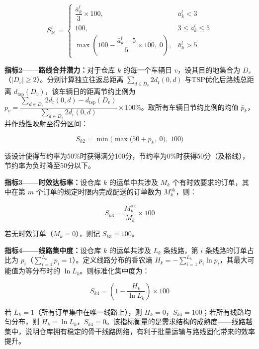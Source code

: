 \begin{equation}\label{eq:score_s1_line}
S_{k1}^l = \begin{cases}
\dfrac{\bar{a}_k^l}{3} \times 100, & \bar{a}_k^l < 3\\
100, & 3 \leq \bar{a}_k^l \leq 5\\
\max\!\left(100 - \dfrac{\bar{a}_k^l - 5}{5} \times 100,\; 0\right), & \bar{a}_k^l > 5
\end{cases}
\end{equation}

{\bf 指标2——路线合并潜力：}对于仓库 $k$ 的每一个车辆日 $v$，设其目的地集合为 $D_v$（$|D_v| \geq 2$）。分别计算独立往返总距离 $\sum_{d \in D_v} 2 d_{\mathrm{r}}(0,d)$ 与TSP优化后路线总距离 $d_{\mathrm{tsp}}(D_v)$，该车辆日的距离节约比例为 $p_v = \dfrac{\sum_{d \in D_v} 2 d_{\mathrm{r}}(0,d) - d_{\mathrm{tsp}}(D_v)}{\sum_{d \in D_v} 2 d_{\mathrm{r}}(0,d)} \times 100\%$。取所有车辆日节约比例的均值 $\bar{p}_k$，并作线性映射至得分区间：

\begin{equation}\label{eq:score_s2}
S_{k2} = \min\!\bigl(\max\!\bigl(50 + \bar{p}_k,\; 0\bigr),\; 100\bigr)
\end{equation}

该设计使得节约率为50\%时获得满分100分，节约率为0\%时获得50分（及格线），节约率为负时降至50分以下。

{\bf 指标3——时效达标率：}设仓库 $k$ 的运单中共涉及 $M_k$ 个有时效要求的订单，其中在第 $m$ 个订单的规定时限内完成配送的订单数为 $M_k^{\text{ok}}$，则：

\begin{equation}\label{eq:score_s3}
S_{k3} = \frac{M_k^{\text{ok}}}{M_k} \times 100
\end{equation}

若无时效订单（$M_k = 0$），则记 $S_{k3} = 100$。

{\bf 指标4——线路集中度：}设仓库 $k$ 的运单共涉及 $L_k$ 条线路，第 $i$ 条线路的订单占比为 $p_i$（$\sum_{i=1}^{L_k} p_i = 1$）。定义线路分布的香农熵 $H_k = -\sum_{i=1}^{L_k} p_i \ln p_i$，其最大可能值为等分布时的 $\ln L_k$。则标准化集中度为：

\begin{equation}\label{eq:score_s4}
S_{k4} = \left(1 - \frac{H_k}{\ln L_k}\right) \times 100
\end{equation}

若 $L_k = 1$（所有订单集中在唯一线路上），则 $H_k = 0$，$S_{k4} = 100$；若所有线路均匀分布，则 $H_k = \ln L_k$，$S_{k4} = 0$。该指标衡量的是需求结构的成熟度——线路越集中，说明仓库拥有稳定的骨干线路网络，有利于批量运输与路线固化带来的效率提升。

